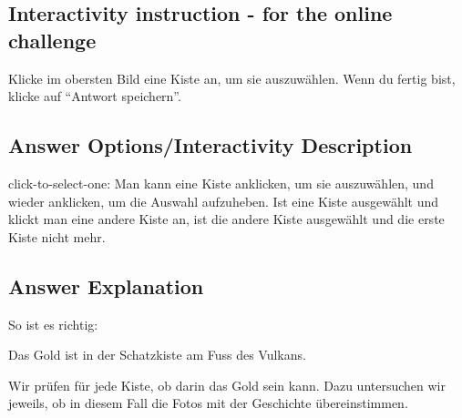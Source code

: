 \documentclass[a4paper,11pt]{report}
\newcommand{\taskGraphicsFolder}{..}
\begin{document}
\subsection*{Interactivity instruction - for the online challenge}

Klicke im obersten Bild eine Kiste an, um sie auszuwählen. Wenn du fertig bist, klicke auf \enquote{Antwort speichern}.

\begingroup
\renewcommand{\arraystretch}{1.5}
\subsection*{Answer Options/Interactivity Description}

click-to-select-one:  Man kann eine Kiste anklicken, um sie auszuwählen, und wieder anklicken, um die Auswahl aufzuheben.  Ist eine Kiste ausgewählt und klickt man eine andere Kiste an, ist die andere Kiste ausgewählt und die erste Kiste nicht mehr.

\endgroup

\subsection*{Answer Explanation}

So ist es richtig:

{\centering%
\par}

Das Gold ist in der Schatzkiste am Fuss des Vulkans.

Wir prüfen für jede Kiste, ob darin das Gold sein kann.  Dazu untersuchen wir jeweils, ob in diesem Fall die Fotos mit der Geschichte übereinstimmen.
\end{document}
